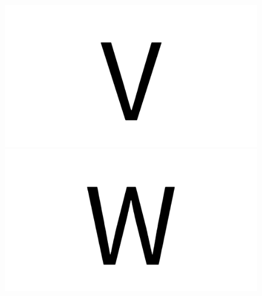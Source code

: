 \documentclass{article}
\begin{document}
\begin{figure}[H]
  \includegraphics[width=\linewidth]{u_V}
\endminipage\hfill
{}
  \includegraphics[width=\linewidth]{u_W}
\endminipage\hfill
\end{figure}
\end{document}
